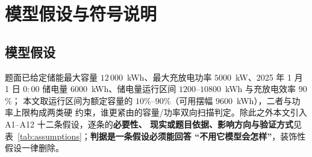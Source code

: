 
\section{模型假设与符号说明}\label{chap:assump}

\subsection{模型假设}

题面已给定储能最大容量 \(12\,000\)~kWh、最大充放电功率 \(5000\)~kW、2025 年 1 月 1 日
\(0{:}00\) 储电量 \(6000\)~kWh、储电量运行区间 \(1200\)--\(10800\)~kWh 与充放电效率 \(90\)\%；
本文取运行区间为额定容量的 \(10\)\%--\(90\)\%（可用摆幅 \(9600\)~kWh），二者与功率上限构成两类硬
约束，谁更紧由的容量/功率双向扫描判定。除此之外本文引入 A1--A12 十二条假设，逐条的\textbf{必要性、
现实或题目依据、影响方向与验证方式}见表~\ref{tab:assumptions}；\textbf{判据是一条假设必须能回答
“不用它模型会怎样”}，装饰性假设一律删除。

